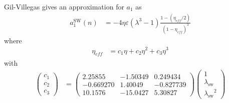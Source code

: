 \documentclass[letterpaper,twocolumn,amsmath,amssymb,prb]{revtex4-1}
\newcommand{\lambdaSW}{\ensuremath{\lambda_\text{sw}}}
\begin{document}
Gil-Villegas\cite{gil-villegas97} gives an approximation for $a_1$ as
\begin{align}
  a_1^\text{SW}(n) &= -4\eta\varepsilon(\lambda^3 - 1)\frac{1 - \left( \eta_\textit{eff}/2 \right)}{(1 - \eta_\textit{eff})^3}
\end{align}
where
\begin{align}
  \eta_\textit{eff} &= c_1\eta + c_2\eta^2 + c_3\eta^3
\end{align}
with
\begin{align}
  \left( \begin{array}{c}
    c_1 \\
    c_2 \\
    c_3
    \end{array} \right)
  &= \left( \begin{array}{ccc}
    2.25855 & -1.50349 & 0.249434 \\
    -0.669270 & 1.40049 & -0.827739 \\
    10.1576 & -15.0427 & 5.30827
    \end{array} \right)
  \left( \begin{array}{c}
    1 \\
    \lambdaSW \\
    \lambdaSW^2
    \end{array} \right)
\end{align}


\end{document}
